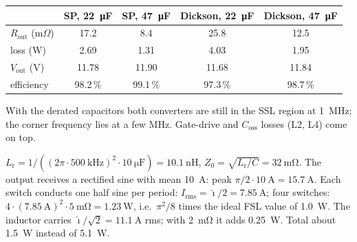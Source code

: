 \begin{solutionblock}
	\begin{center}
		\begin{tabular}{|l|c|c|c|c|}
			\hline
			                                & SP, \SI{22}{\micro\farad} & SP, \SI{47}{\micro\farad} & Dickson, \SI{22}{\micro\farad} & Dickson, \SI{47}{\micro\farad} \\
			\hline
			$R_\mathrm{out}$ (m$\Omega$)    & 17.2                      & 8.4                       & 25.8                           & 12.5                           \\
			loss (W)                        & 2.69                      & 1.31                      & 4.03                           & 1.95                           \\
			$V_\mathrm{out}$ (V)            & 11.78                     & 11.90                     & 11.68                          & 11.84                          \\
			efficiency                      & 98.2\,\%                  & 99.1\,\%                  & 97.3\,\%                       & 98.7\,\%                       \\
			\hline
		\end{tabular}
		\label{tab:ex11_b6}
	\end{center}
	With the derated capacitors both converters are still in the SSL region at \SI{1}{\mega\hertz}; the corner frequency lies at a few MHz. Gate-drive and $C_\mathrm{oss}$ losses (L2, L4) come on top.
\end{solutionblock}




\begin{solutionblock}
	$L_\mathrm{r}=1/((2\pi\cdot\SI{500}{\kilo\hertz})^2\cdot\SI{10}{\micro\farad})=\SI{10.1}{\nano\henry}$, $Z_0=\sqrt{L_\mathrm{r}/C}=\SI{32}{\milli\ohm}$. The output receives a rectified sine with mean \SI{10}{\ampere}: peak $\pi/2\cdot\SI{10}{\ampere}=\SI{15.7}{\ampere}$. Each switch conducts one half sine per period: $I_\mathrm{rms}=\hat{\imath}/2=\SI{7.85}{\ampere}$; four switches: $4\cdot(\SI{7.85}{\ampere})^2\cdot\SI{5}{\milli\ohm}=\SI{1.23}{\watt}$, i.e.\ $\pi^2/8$ times the ideal FSL value of \SI{1.0}{\watt}. The inductor carries $\hat{\imath}/\sqrt2=\SI{11.1}{\ampere}$ rms; with \SI{2}{\milli\ohm} it adds \SI{0.25}{\watt}. Total about \SI{1.5}{\watt} instead of \SI{5.1}{\watt}.
\end{solutionblock}

